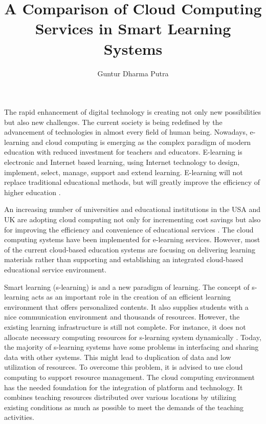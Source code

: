\documentclass[journal]{vgtc}
\title{A Comparison of Cloud Computing Services in Smart Learning Systems}
\author{Guntur Dharma Putra}
\begin{document}
\maketitle

The rapid enhancement of digital technology is creating not only new possibilities but also new challenges. The current society is being redefined by the advancement of technologies in almost every field of human being. Nowadays, e-learning and cloud computing is emerging as the complex paradigm of modern education with reduced investment for teachers and educators. E-learning is electronic and Internet based learning, using Internet technology to design, implement, select, manage, support and extend learning. E-learning will not replace traditional educational methods, but will greatly improve the efficiency of higher education \cite{SudhirKumarSharmaNidhiGoyal2014}.

An increasing number of universities and educational institutions in the USA and UK are adopting cloud computing not only for incrementing cost savings but also for improving the efficiency and convenience of educational services \cite{jeong2013cloud}. The cloud computing systems have been implemented for e-learning services. However, most of the current cloud-based education systems are focusing on delivering learning materials rather than supporting and establishing an integrated cloud-based educational service environment.

Smart learning (s-learning) is and a new paradigm of learning. The concept of s-learning acts as an important role in the creation of an efficient learning environment that offers personalized contents. It also supplies students with a nice communication environment and thousands of resources. However, the existing learning infrastructure is still not complete. For instance, it does not allocate necessary computing resources for s-learning system dynamically \cite{Uden2007}. Today, the majority of s-learning systems have some problems in interfacing and sharing data with other systems. This might lead to duplication of data and low utilization of resources. To overcome this problem, it is advised to use cloud computing to support resource management. The cloud computing environment has the needed foundation for the integration of platform and technology. It combines teaching resources distributed over various locations by utilizing existing conditions as much as possible to meet the demands of the teaching activities.
\end{document}
